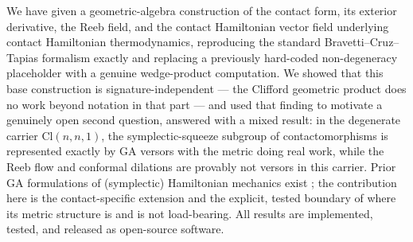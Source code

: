 \documentclass[11pt]{article}
\newcommand{\Cl}{\mathrm{Cl}}
\begin{document}
We have given a geometric-algebra construction of the contact form, its exterior derivative, the Reeb field, and the contact Hamiltonian vector field underlying contact Hamiltonian thermodynamics, reproducing the standard Bravetti--Cruz--Tapias formalism exactly and replacing a previously hard-coded non-degeneracy placeholder with a genuine wedge-product computation. We showed that this base construction is signature-independent — the Clifford geometric product does no work beyond notation in that part — and used that finding to motivate a genuinely open second question, answered with a mixed result: in the degenerate carrier $\Cl(n,n,1)$, the symplectic-squeeze subgroup of contactomorphisms is represented exactly by GA versors with the metric doing real work, while the Reeb flow and conformal dilations are provably not versors in this carrier. Prior GA formulations of (symplectic) Hamiltonian mechanics exist \cite{hestenes1993hamiltonian,pappas1993hamiltonian,aboueldahab2000hamiltonian}; the contribution here is the contact-specific extension and the explicit, tested boundary of where its metric structure is and is not load-bearing. All results are implemented, tested, and released as open-source software.
\end{document}
